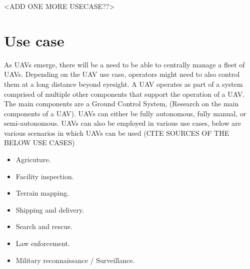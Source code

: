 <ADD ONE MORE USECASE??>
\section{Use case}
\label{sec:use-case}

As UAVs emerge, there will be a need to be able to centrally manage a fleet of UAVs. Depending on the UAV use case, operators might need to also control them at a long distance beyond eyesight. A UAV operates as part of a system comprised of multiple other components that support the operation of a UAV. The main components are a Ground Control System, (Research on the main components of a UAV). UAVs can either be fully autonomous, fully manual, or semi-autonomous. UAVs can also be employed in various use cases, below are various scenarios in which UAVs can be used (CITE SOURCES OF THE BELOW USE CASES)
\begin{itemize}
    \item Agricuture.
    \item Facility inspection.
    \item Terrain mapping.
    \item Shipping and delivery.
    \item Search and rescue.
    \item Law enforcement.
    \item Military reconnaissance / Surveillance.
\end{itemize}

